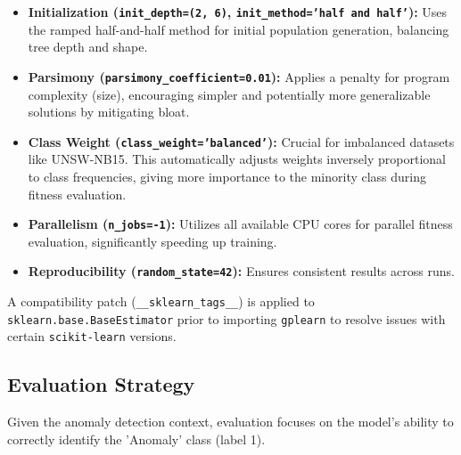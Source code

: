 \documentclass{article}
\begin{document}
\begin{itemize}
    \item \textbf{Initialization (\texttt{init\_depth=(2, 6)}, \texttt{init\_method='half and half'}):} Uses the ramped half-and-half method for initial population generation, balancing tree depth and shape.
    \item \textbf{Parsimony (\texttt{parsimony\_coefficient=0.01}):} Applies a penalty for program complexity (size), encouraging simpler and potentially more generalizable solutions by mitigating bloat.
    \item \textbf{Class Weight (\texttt{class\_weight='balanced'}):} Crucial for imbalanced datasets like UNSW-NB15. This automatically adjusts weights inversely proportional to class frequencies, giving more importance to the minority class during fitness evaluation.
    \item \textbf{Parallelism (\texttt{n\_jobs=-1}):} Utilizes all available CPU cores for parallel fitness evaluation, significantly speeding up training.
    \item \textbf{Reproducibility (\texttt{random\_state=42}):} Ensures consistent results across runs.
\end{itemize}
A compatibility patch (\texttt{\_\_sklearn\_tags\_\_}) is applied to \texttt{sklearn.base.BaseEstimator} prior to importing \texttt{gplearn} to resolve issues with certain \texttt{scikit-learn} versions.

\subsection{Evaluation Strategy}
Given the anomaly detection context, evaluation focuses on the model's ability to correctly identify the 'Anomaly' class (label 1).
\end{document}
